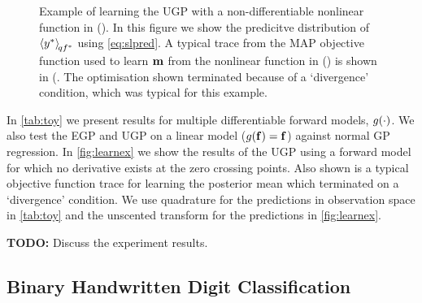 \documentclass{article} %
\begin{document}
\begin{figure}[tb]
    \caption[]{Example of learning the UGP with a non-differentiable nonlinear
        function in (). In this figure we show the predicitve
        distribution of $\left\langle{\ensuremath{y}\ensuremath{^{*}}}\right\rangle_{\!{qf^{*}}}$ using
        \eqref{eq:slpred}. A typical trace from the MAP objective function used
        to learn $\mathbf{m}$ from the nonlinear function in ()
        is shown in (. The optimisation shown terminated
        because of a `divergence' condition, which was typical for this
        example.}

    \label{fig:learnex}
\end{figure}

In \autoref{tab:toy} we present results for multiple differentiable forward
models, $g\!\left({{\cdot}}\right)$. We also test the EGP and UGP on a linear model
($g\!\left({{\mathbf{f}}}\right) = \mathbf{f}$) against normal GP regression. In
\autoref{fig:learnex} we show the results of the UGP using a forward model for
which no derivative exists at the zero crossing points. Also shown is a typical
objective function trace for learning the posterior mean which terminated on a
`divergence' condition. We use quadrature for the predictions in observation
space in \autoref{tab:toy} and the unscented transform for the predictions in
\autoref{fig:learnex}.

\textbf{TODO:} Discuss the experiment results.


\subsection{Binary Handwritten Digit Classification}
\end{document}
